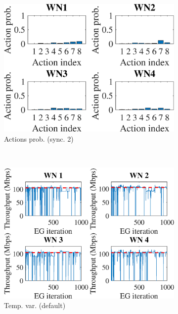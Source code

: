 \documentclass[preprint,12pt]{article}
\begin{document}
\begin{figure}[h!]
\begin{subfigure}[b]{.3\textwidth}
		\includegraphics[width=\textwidth]{images/actions_probability_CEG}
		\caption{Actions prob. (sync. 2)}\label{fig:actions_probability_CEG}
	\end{subfigure}\\
	\begin{subfigure}[b]{.3\textwidth}
		\includegraphics[width=\textwidth]{images/temporal_individual_tpt_EG}
		\caption{Temp. var.  (default)}\label{fig:temporal_individual_tpt_EG}
	\end{subfigure}
	\begin{subfigure}[b]{.3\textwidth}

\end{subfigure}
\end{figure}
\end{document}
